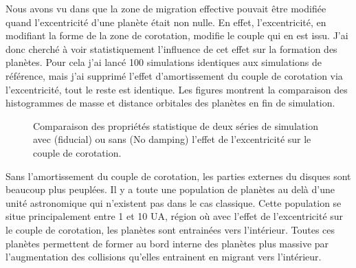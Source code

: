\bigskip

Nous avons vu dans  que la zone de migration effective pouvait être modifiée quand l'excentricité d'une planète était non nulle. En effet, l'excentricité, en modifiant la forme de la zone de corotation, modifie le couple qui en est issu. J'ai donc cherché à voir statistiquement l'influence de cet effet sur la formation des planètes. Pour cela j'ai lancé 100 simulations identiques aux simulations de référence, mais j'ai supprimé l'effet d'amortissement du couple de corotation via l'excentricité, tout le reste est identique. Les figures  montrent la comparaison des histogrammes de masse et distance orbitales des planètes en fin de simulation.

\begin{figure}[htb]
\centering
{}\hfill
{}
\caption{Comparaison des propriétés statistique de deux séries de simulation avec (fiducial) ou sans (No damping) l'effet de l'excentricité sur le couple de corotation.}\label{fig:HSE_no_damping}
\end{figure}

Sans l'amortissement du couple de corotation, les parties externes du disques sont beaucoup plus peuplées. Il y a toute une population de planètes au delà d'une unité astronomique qui n'existent pas dans le cas classique. Cette population se situe principalement entre 1 et 10 UA, région où avec l'effet de l'excentricité sur le couple de corotation, les planètes sont entrainées vers l'intérieur. Toutes ces planètes permettent de former au bord interne des planètes plus massive par l'augmentation des collisions qu'elles entrainent en migrant vers l'intérieur. 

